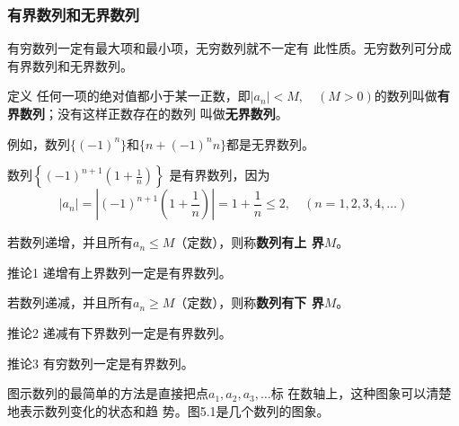 \subsubsection{有界数列和无界数列}
有穷数列一定有最大项和最小项，无穷数列就不一定有
此性质。无穷数列可分成有界数列和无界数列。

\begin{blk}{定义}
任何一项的绝对值都小于某一正数，即$|a_n|<M,\quad (M>0)$的数列叫做\textbf{有界数列}；没有这样正数存在的数列
叫做\textbf{无界数列}。    
\end{blk}
 
例如，数列$\{(-1)^n\}$和$\{n+(-1)^n n\}$都是无界数列。

数列$\left\{(-1)^{n+1}\left(1+\frac{1}{n}\right)\right\}$
是有界数列，因为
\[|a_n|=\left|(-1)^{n+1}\left(1+\frac{1}{n}\right)\right|=1+\frac{1}{n}\le 2,\quad (n=1,
2,3,4,\ldots)\]

若数列递增，并且所有$a_n\le M$（定数），则称\textbf{数列有上
界}$M$。

\begin{blk}{推论1}
    递增有上界数列一定是有界数列。
\end{blk}

 若数列递减，并且所有$a_n\ge M$（定数），则称\textbf{数列有下
界}$M$。

\begin{blk}{推论2 }
    递减有下界数列一定是有界数列。
\end{blk}

\begin{blk}{推论3}
    有穷数列一定是有界数列。
\end{blk}

图示数列的最简单的方法是直接把点$a_1,a_2,a_3,\ldots$标
在数轴上，这种图象可以清楚地表示数列变化的状态和趋
势。图5.1是几个数列的图象。

